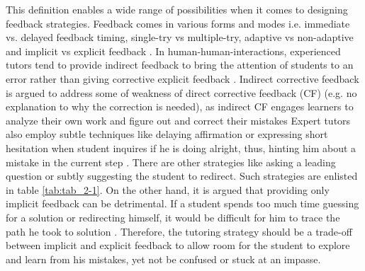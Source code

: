 This definition enables a wide range of possibilities when it comes to designing feedback strategies. Feedback comes in various forms and modes i.e. immediate vs. delayed feedback timing, single-try vs multiple-try, adaptive vs non-adaptive and implicit vs explicit feedback \parencite{narciss2008feedback}. In human-human-interactions, experienced tutors tend to provide indirect feedback to bring the attention of students to an error rather than giving corrective explicit feedback \parencite{lepper1990self}. Indirect corrective feedback is argued to address some of weakness of direct corrective feedback (CF) (e.g. no explanation to why the correction is needed), as indirect CF engages learners to analyze their own work and figure out and correct their mistakes Expert tutors also employ subtle techniques like delaying affirmation or expressing short hesitation when student inquires if he is doing alright, thus, hinting him about a mistake in the current step \parencite{fox1991cognitive}. There are other strategies like asking a leading question or subtly suggesting the student to redirect. Such strategies are enlisted in table \ref{tab:tab_2-1}. On the other hand, it is argued that providing only implicit feedback can be detrimental. If a student spends too much time guessing for a solution or redirecting himself, it would be difficult for him to trace the path he took to solution \parencite{lewis1985discrimination}. Therefore, the tutoring strategy should be a trade-off between implicit and explicit feedback to allow room for the student to explore and learn from his mistakes, yet not be confused or stuck at an impasse. 

